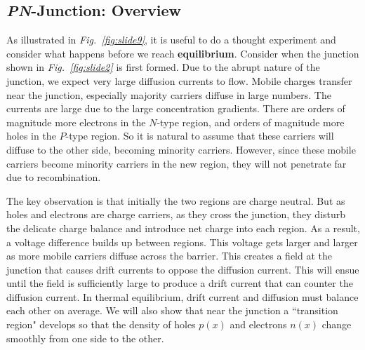 \subsection{\emph{PN}-Junction: Overview}
As illustrated in \emph{Fig.~\ref{fig:slide9}}, it is useful to do a thought experiment and consider what happens before we reach \textbf{equilibrium}. Consider when the junction shown in \emph{Fig.~\ref{fig:slide2}} is first formed.  Due to the abrupt nature of the junction, we expect very large diffusion currents to flow.  Mobile charges transfer near the junction, especially majority carriers diffuse in large numbers.  The currents are large due to the large concentration gradients.  There are orders of magnitude more electrons in the $N$-type region, and orders of magnitude more holes in the $P$-type region.  So it is natural to assume that these carriers will diffuse to the other side, becoming minority carriers.  However, since these mobile carriers become minority carriers in the new region, they will not penetrate far due to recombination.

The key observation is that initially the two regions are charge neutral.  But as holes and electrons are charge carriers, as they cross the junction, they disturb the delicate charge balance and introduce net charge into each region.  As a result, a voltage difference builds up between regions.  This voltage gets larger and larger as more mobile carriers diffuse across the barrier.   This creates a field at the junction that causes drift currents to oppose the diffusion current.  This will ensue until the field is sufficiently large to produce a drift current that can counter the diffusion current.  In thermal equilibrium, drift current and diffusion must balance each other on average.  We will also show that near the junction a ``transition region" develops so that the density of holes $p(x)$ and electrons $n(x)$ change smoothly from one side to the other.
